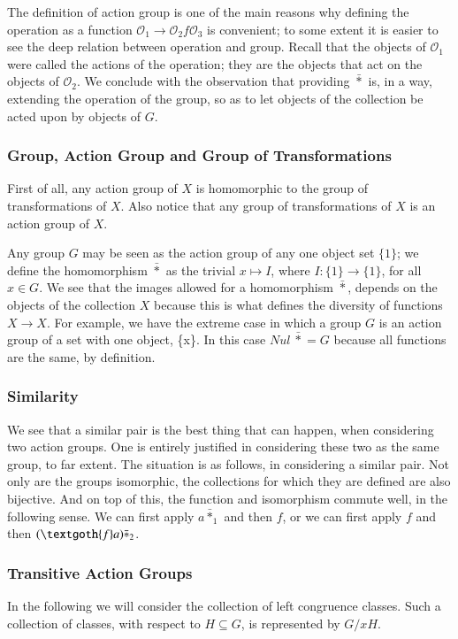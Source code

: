 \documentclass [12pt]{book}
\begin{document}
The definition of action group is one of the main reasons why defining the operation as a function $\mathcal{O}_1\rightarrow\mathcal{O}_2f\mathcal{O}_3$ is convenient; to some extent it is easier to see the deep relation between operation and group. Recall that the objects of $\mathcal{O}_1$ were called the actions of the operation; they are the objects that act on the objects of $\mathcal{O}_2$. We conclude with the observation that providing $\bar*$ is, in a way, extending the operation of the group, so as to let objects of the collection be acted upon by objects of $G$.

\subsubsection{Group, Action Group and Group of Transformations} First of all, any action group of $X$ is homomorphic to the group of transformations of $X$. Also notice that any group of transformations of $X$ is an action group of $X$. 

Any group $G$ may be seen as the action group of any one object set $\{1\}$; we define the homomorphism $\bar*$ as the trivial $x\mapsto I$, where $I:\{1\}\rightarrow \{1\}$, for all $x\in G$. We see that the images allowed for a homomorphism $\bar*$, depends on the objects of the collection $X$ because this is what defines the diversity of functions $X\rightarrow X$. For example, we have the extreme case in which a group $G$ is an action group of a set with one object, \{x\}. In this case $Nul~\bar*=G$ because all functions are the same, by definition.


\subsubsection{Similarity} We see that a similar pair is the best thing that can happen, when considering two action groups. One is entirely justified in considering these two as the same group, to far extent. The situation is as follows, in considering a similar pair. Not only are the groups isomorphic, the collections for which they are defined are also bijective. And on top of this, the function and isomorphism commute well, in the following sense. We can first apply $a\bar*_1$ and then $f$, or we can first apply $f$ and then $(\textgoth{f}a)\bar*_2$. 

\subsubsection{Transitive Action Groups} In the following we will consider the collection of left congruence classes. Such a collection of classes, with respect to $H\subseteq G$, is represented by $G/xH$.
\end{document}
